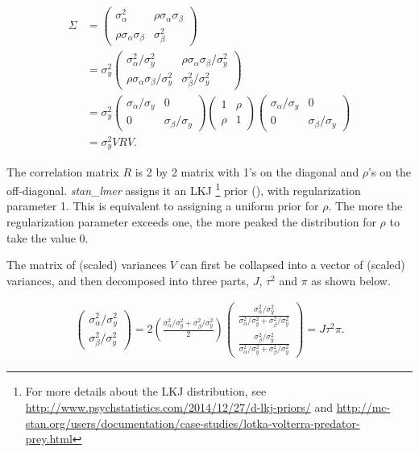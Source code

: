 \begin{align}
	\Sigma &= 
	\left(\begin{matrix} 
		\sigma_\alpha^2 & \rho\sigma_\alpha \sigma_\beta \\ 
		\rho\sigma_\alpha\sigma_\beta&\sigma_\beta^2 
	\end{matrix} \right)\\ &= 
	\sigma_y^2\left(\begin{matrix} 
		\sigma_\alpha^2/\sigma_y^2 & \rho\sigma_\alpha \sigma_\beta/\sigma_y^2 \\ 
		\rho\sigma_\alpha\sigma_\beta/\sigma_y^2 & \sigma_\beta^2/\sigma_y^2 
	\end{matrix} \right)\\ &= 
	\sigma_y^2\left(\begin{matrix} 
		\sigma_\alpha/\sigma_y & 0 \\ 
		0&\sigma_\beta/\sigma_y
	\end{matrix} \right)
	\left(\begin{matrix} 
		1 & \rho\\ 
		\rho&1 
	\end{matrix} \right)
	\left(\begin{matrix} 
		\sigma_\alpha/\sigma_y & 0 \\ 
		0&\sigma_\beta/\sigma_y 
	\end{matrix} \right)\\ 
	&= \sigma_y^2VRV.
\end{align}


The correlation matrix $R$ is 2 by 2 matrix with 1's on the diagonal and $\rho$'s on the off-diagonal. \textit{stan\_lmer} assigns it an LKJ \footnote{For more details about the LKJ distribution, see \url{http://www.psychstatistics.com/2014/12/27/d-lkj-priors/} and \url{http://mc-stan.org/users/documentation/case-studies/lotka-volterra-predator-prey.html}} prior (\cite{lewandowski2009generating}), with regularization parameter 1.  This is equivalent to assigning a uniform prior for $\rho$.  The more the regularization parameter exceeds one, the more peaked the distribution for $\rho$ to take the value 0.  

The matrix of (scaled) variances $V$ can first be collapsed into a vector of (scaled) variances, and then decomposed into three parts, $J$, $\tau^2$ and $\pi$ as shown below. 

\begin{align}
	\left(\begin{matrix} 
		\sigma_\alpha^2/\sigma_y^2 \\ 
		\sigma_\beta^2/\sigma_y^2 
	\end{matrix} \right) = 
	2\left(\frac{\sigma_\alpha^2/\sigma_y^2 + \sigma_\beta^2/\sigma_y^2}{2}\right)\left(\begin{matrix} 
		\frac{\sigma_\alpha^2/\sigma_y^2}{\sigma_\alpha^2/\sigma_y^2 + \sigma_\beta^2/\sigma_y^2} \\ 
		\frac{\sigma_\beta^2/\sigma_y^2}{\sigma_\alpha^2/\sigma_y^2 + \sigma_\beta^2/\sigma_y^2} 
	\end{matrix} \right)=
	J\tau^2 \pi.
\end{align}
 



